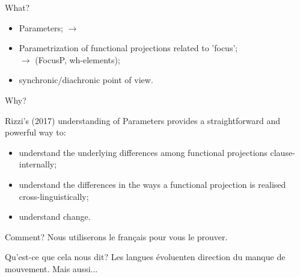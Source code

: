 \documentclass[lesson_slides]{subfiles}
\begin{document}
\begin{frame}[c]{What?}

    \begin{itemize}
        \item[\ding{227}] Parameters; \pause $\longrightarrow$ \cite{rizzi2017} \pause
        \item[\ding{227}] Parametrization of functional projections related to 'focus';\\ \pause
        $\longrightarrow$ (FocusP, wh-elements); \pause
        \item[\ding{227}] synchronic/diachronic point of view.
    \end{itemize}
    
\end{frame}
\begin{frame}[c]{Why?}

    Rizzi's (2017) understanding of Parameters provides a straightforward and powerful way to:
    \begin{itemize}
        \item[\ding{227}] understand the underlying differences among functional projections clause-internally; \pause 
        \item[\ding{227}] understand the differences in the ways a functional projection is realised cross-linguistically;
        \item[\ding{227}] understand change.
    \end{itemize}
  
\end{frame}
\begin{frame}[c]{Comment?}
  Nous utiliserons le français pour vous le prouver.
\end{frame}
\begin{frame}[c]{Qu'est-ce que cela nous dit?}
  Les langues évoluenten direction du manque de mouvement.
  Mais aussi...
\end{frame}
\end{document}
